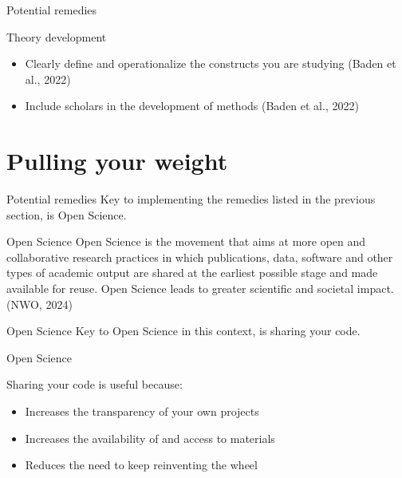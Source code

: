 \documentclass[compress]{beamer}
\begin{document}
\begin{frame}[fragile]{Potential remedies} 	
	\begin{alertblock}{Theory development}
		\begin{itemize}
			\item Clearly define and operationalize the constructs you are studying (Baden et al., 2022)
			\item Include scholars in the development of methods (Baden et al., 2022)
		\end{itemize}
	\end{alertblock}
\end{frame}


\section{Pulling your weight}

\begin{frame}[fragile]{Potential remedies} 	
	Key to implementing the remedies listed in the previous section, is Open Science. 
\end{frame}

\begin{frame}[fragile]{Open Science} 	
	Open Science is the movement that aims at more open and collaborative research practices in which publications, data, software and other types of academic output are shared at the earliest possible stage and made available for reuse. Open Science leads to greater scientific and societal impact. (NWO, 2024) 
\end{frame}

\begin{frame}[fragile]{Open Science} 	
	Key to Open Science in this context, is sharing your code.
\end{frame}

\begin{frame}[fragile]{Open Science} 	
	\begin{alertblock}{Sharing your code is useful because:}
		\begin{itemize}
			\item Increases the transparency of your own projects
			\item Increases the availability of and access to materials
			\item Reduces the need to keep reinventing the wheel
		\end{itemize}
	\end{alertblock}
\end{frame}
\end{document}
